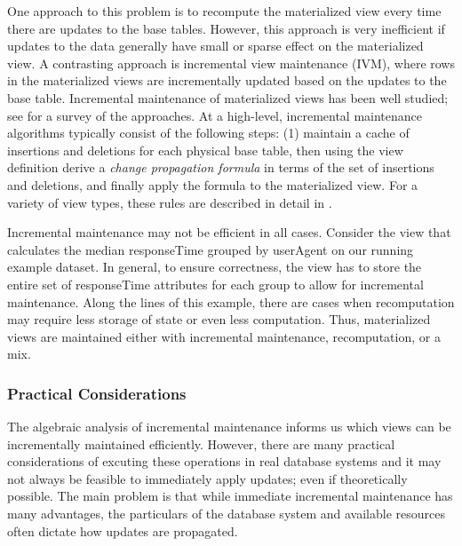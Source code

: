 One approach to this problem is to recompute the materialized view every time there are updates to the base tables.
However, this approach is very inefficient if updates to the data generally have small or sparse effect on the materialized view. 
A contrasting approach is incremental view maintenance (IVM), where rows in the materialized views are incrementally updated based on the updates to the base table.
Incremental maintenance of materialized views has been well studied; see \cite{chirkova2011materialized} for a survey of the approaches. 
At a high-level, incremental maintenance algorithms typically consist of the following steps: (1) maintain a cache of insertions and deletions for each physical base table, then using the view definition derive a \emph{change propagation formula} in terms of the set of insertions and deletions, and finally apply the formula to the materialized view.
For a variety of view types, these rules are described in detail in \cite{DBLP:journals/vldb/KochAKNNLS14, DBLP:conf/pods/Koch10}.

Incremental maintenance may not be efficient in all cases.
Consider the view that calculates the median responseTime grouped by userAgent on our running example dataset.
In general, to ensure correctness, the view has to store the entire set of responseTime attributes for each group to allow for incremental maintenance.
Along the lines of this example, there are cases when recomputation may require less storage of state or even less computation.
Thus, materialized views are maintained either with incremental maintenance, recomputation, or a mix.

\subsubsection{Practical Considerations}
The algebraic analysis of incremental maintenance \cite{DBLP:journals/vldb/KochAKNNLS14, DBLP:conf/pods/Koch10} informs us which views can be incrementally maintained efficiently.
However, there are many practical considerations of excuting these operations in real database systems and it may not always be feasible to immediately apply updates; even if theoretically possible.
The main problem is that while immediate incremental maintenance has many advantages, the particulars of the database system and available resources often dictate how updates are propagated.

